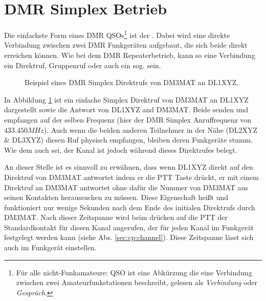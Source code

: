 \section{DMR Simplex Betrieb} \label{sec:simplex}
Die einfachste Form eines DMR QSOs\footnote{Für alle nicht-Funkamateure: QSO ist eine Abkürzung die eine Verbindung zwischen zwei Amateurfunkstationen beschreibt, gelesen als \emph{Verbindung} oder \emph{Gespräch}.} ist der . Dabei wird eine direkte Verbindung zwischen zwei DMR Funkgeräten aufgebaut, die sich beide direkt erreichen können. Wie bei dem DMR Repeaterbetrieb, kann so eine Verbindung ein Direktruf, Gruppenruf oder auch ein sog.  sein. 

\begin{figure}[!ht]
 \centering
 \caption{Beispiel eines DMR Simplex Direktrufs von DM3MAT an DL1XYZ.} \label{fig:splxpc}
\end{figure}

In Abbildung \ref{fig:splxpc} ist ein einfache Simplex Direktruf von DM3MAT an DL1XYZ dargestellt sowie die Antwort von DL1XYZ and DM3MAT. Beide senden und empfangen auf der selben Frequenz (hier der DMR Simplex Anruffrequenz von $433.450 MHz$). Auch wenn die beiden anderen Teilnehmer in der Nähe (DL2XYZ \& DL3XYZ) diesen Ruf physisch empfangen, bleiben deren Funkgeräte stumm. Wie dem auch sei, der Kanal ist jedoch während dieses Direktrufes belegt. 

An dieser Stelle ist es sinnvoll zu erwähnen, dass wenn DL1XYZ direkt auf den Direktruf von DM3MAT antwortet indem er die PTT Taste drückt, er mit einem Direktruf an DM3MAT antwortet ohne dafür die Nummer von DM3MAT aus seinen Kontakten heraussuchen zu müssen. Diese Eigenschaft heißt  und funktioniert nur wenige Sekunden nach dem Ende des initialen Direktrufs durch DM3MAT. Nach dieser Zeitspanne wird beim drücken auf die PTT der Standardkontakt für diesen Kanal angerufen, der für jeden Kanal im Funkgerät festgelegt werden kann (siehe Abs. \ref{sec:cp:channel}). Diese Zeitspanne lässt sich auch im Funkgerät einstellen.

